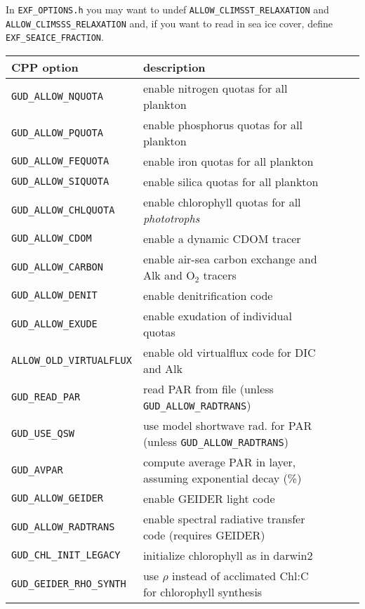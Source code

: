 \documentclass[11pt,letterpaper,english]{article}
\begin{document}
{In \verb|EXF_OPTIONS.h| you may want to undef \verb|ALLOW_CLIMSST_RELAXATION|
and \verb|ALLOW_CLIMSSS_RELAXATION| and, if you want to read in sea ice cover,
define \verb|EXF_SEAICE_FRACTION|.

{\renewcommand{\arraystretch}{1.2}
\begin{longtable}[l]{ll>{$}l<{$}l>{$}r<{$}}
\textbf{CPP option} & \textbf{description} \\
\hline
\endhead
  \verb|GUD_ALLOW_NQUOTA|             & enable nitrogen quotas for all plankton \\
  \verb|GUD_ALLOW_PQUOTA|             & enable phosphorus quotas for all plankton \\
  \verb|GUD_ALLOW_FEQUOTA|            & enable iron quotas for all plankton \\
  \verb|GUD_ALLOW_SIQUOTA|            & enable silica quotas for all plankton \\
  \verb|GUD_ALLOW_CHLQUOTA|           & enable chlorophyll quotas for all \emph{phototrophs} \\
  \verb|GUD_ALLOW_CDOM|               & enable a dynamic CDOM tracer \\
  \verb|GUD_ALLOW_CARBON|             & enable air-sea carbon exchange and Alk and O$_2$ tracers \\
  \hline
  \verb|GUD_ALLOW_DENIT|              & enable denitrification code \\
  \verb|GUD_ALLOW_EXUDE|              & enable exudation of individual quotas \\
  \verb|ALLOW_OLD_VIRTUALFLUX|        & enable old virtualflux code for DIC and Alk \\
  \hline
  \verb|GUD_READ_PAR|                 & read PAR from file (unless \verb|GUD_ALLOW_RADTRANS|) \\
  \verb|GUD_USE_QSW|                  & use model shortwave rad. for PAR (unless \verb|GUD_ALLOW_RADTRANS|) \\
  \verb|GUD_AVPAR|                    & compute average PAR in layer, assuming exponential decay (\%) \\
  \verb|GUD_ALLOW_GEIDER|             & enable GEIDER light code \\
  \verb|GUD_ALLOW_RADTRANS|           & enable spectral radiative transfer code (requires GEIDER) \\
  \verb|GUD_CHL_INIT_LEGACY|          & initialize chlorophyll as in darwin2 \\
  \verb|GUD_GEIDER_RHO_SYNTH|         & use $\rho$ instead of acclimated Chl:C for chlorophyll synthesis \\

\end{longtable}}}
\end{document}

